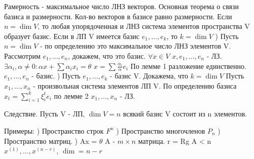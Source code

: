 \documentclass[12pt]{article}
\begin{document}
    Рамерность - максимальное число ЛНЗ векторов. \newline
    Основная теорема о связи базиса и размерности. \newline
    Кол-во векторов в базисе равно размерности. \newline
    Если $n = \dim V$, то любая упорядоченная и ЛНЗ система элементов пространства V образует базис. \newline
    Если в ЛП V имеется базис $e_1, \dots, e_k$, то $k = \dim V$ ) Пусть $n = \dim V$ - по определению это максимальное число ЛНЗ элементов V. \newline
    Рассмотрим $e_1, \dots, e_n$, докажем, что это базис. \newline
    $\forall x \in V$ $x, e_1, \dots, e_n$ - ЛЗ. \newline
    $\exists \alpha_i, \alpha \not = 0: \alpha x + \sum \alpha_i x_i = \theta$ \newline 
    $x = \sum \frac{\alpha_i}{\alpha} e_i$ \newline
    По лемме 1 разложение единственно. \newline
    $e_1, \dots, e_n$ - базис. ) Пусть $e_1, \dots, e_k$ - базис V. \newline
    Докажема, что $k = \dim V$ \newline
    Пусть $x_1, \dots, x_n$ - произвольная система элементов ЛП V. \newline
    По определению базиса $x_t = \sum\limits_{i = 1}^k \xi_i^{t} e_i$ по лемме 2 $x_1, \dots, x_n$ - ЛЗ. \newline
    
    Следствие. Пусть V - ЛП, $\dim V = n$ всякий базис V состоит из n элементов. \newline
    
    Примеры: ) Пространство строк $F^n$ ) Пространство многочленов $P_n$ ) Пространство матриц.  ) Ax = $\theta$ \newline
    A - $m\times n$ матрица. \newline
    r = Rg A < n \newline
    $x^{(1)}, \dots, x^{(n - r)}$, $\dim = n - r$ \newline
\end{document}
